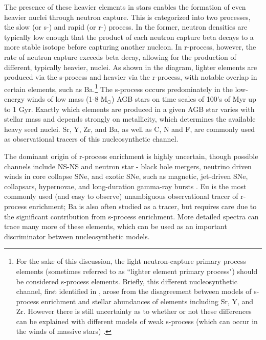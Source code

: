 The presence of these heavier elements in stars enables the formation of even heavier nuclei through neutron capture. This is categorized into two processes, the slow (or s-) and rapid (or r-) process. In the former, neutron densities are typically low enough that the product of each neutron capture beta decays to a more stable isotope before capturing another nucleon. In r-process, however, the rate of neutron capture exceeds beta decay, allowing for the production of different, typically heavier, nuclei. As shown in the diagram, lighter elements are produced via the s-process and heavier via the r-process, with notable overlap in certain elements, such as Ba.\footnote{For the sake of this discussion, the light neutron-capture primary process elements (sometimes referred to as ``lighter element primary process") should be considered s-process elements. Briefly, this different nucleosynthetic channel, first identified in \cite{Travaglio2004}, arose from the disagreement between models of s-process enrichment and stellar abundances of elements including Sr, Y, and Zr. However there is still uncertainty as to whether or not these differences can be explained with different models of weak s-process (which can occur in the winds of massive stars) \citep[e.g.][]{Prantzos2018}.} The s-process occurs predominately in the low-energy winds of low mass (1-8 M$_{\odot}$) AGB stars on time scales of 100's of Myr up to 1 Gyr. Exactly which elements are produced in a given AGB star varies with stellar mass and depends strongly on metallicity, which determines the available heavy seed nuclei. Sr, Y, Zr, and Ba, as well as C, N and F, are commonly used as observational tracers of this nucleosynthetic channel.

The dominant origin of r-process enrichment is highly uncertain, though possible channels include NS-NS and neutron star - black hole mergers, neutrino driven winds in core collapse SNe, and exotic SNe, such as magnetic, jet-driven SNe, collapsars, hypernovae, and long-duration gamma-ray bursts \citep[see ][ for recent reviews]{Frebel2018, Cowan2019}. Eu is the most commonly used (and easy to observe) unambiguous observational tracer of r-process enrichment; Ba is also often studied as a tracer, but requires care due to the significant contribution from s-process enrichment. More detailed spectra \citep[e.g.][]{Ji2018a} can trace many more of these elements, which can be used as an important discriminator between nucleosynthetic models.

